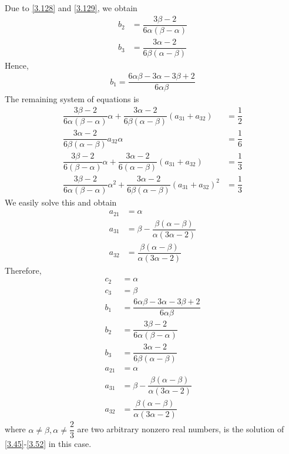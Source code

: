 \documentclass[a4paper,oneside]{book}
\numberwithin{equation}{chapter}
\begin{document}
\begin{enumerate}
Due to \eqref{3.128} and \eqref{3.129}, we obtain
\begin{align}
{b_2} &= \dfrac{{3\beta  - 2}}{{6\alpha \left( {\beta  - \alpha } \right)}}\\
{b_3} &= \dfrac{{3\alpha  - 2}}{{6\beta \left( {\alpha  - \beta } \right)}}
\end{align}
Hence, 
\begin{align}
{b_1} = \dfrac{{6\alpha \beta  - 3\alpha  - 3\beta  + 2}}{{6\alpha \beta }}
\end{align}
The remaining system of equations is
\begin{align}
\dfrac{{3\beta  - 2}}{{6\alpha \left( {\beta  - \alpha } \right)}}\alpha  + \dfrac{{3\alpha  - 2}}{{6\beta \left( {\alpha  - \beta } \right)}}\left( {{a_{31}} + {a_{32}}} \right) &= \dfrac{1}{2}\\
\dfrac{{3\alpha  - 2}}{{6\beta \left( {\alpha  - \beta } \right)}}{a_{32}}\alpha &= \dfrac{1}{6}\\
\dfrac{{3\beta  - 2}}{{6\left( {\beta  - \alpha } \right)}}\alpha  + \dfrac{{3\alpha  - 2}}{{6\left( {\alpha  - \beta } \right)}}\left( {{a_{31}} + {a_{32}}} \right) &= \dfrac{1}{3}\\
\dfrac{{3\beta  - 2}}{{6\alpha \left( {\beta  - \alpha } \right)}}{\alpha ^2} + \dfrac{{3\alpha  - 2}}{{6\beta \left( {\alpha  - \beta } \right)}}{\left( {{a_{31}} + {a_{32}}} \right)^2} &= \dfrac{1}{3}
\end{align}
We easily solve this and obtain
\begin{align}
{a_{21}} &= \alpha \\
{a_{31}} &= \beta  - \dfrac{{\beta \left( {\alpha  - \beta } \right)}}{{\alpha \left( {3\alpha  - 2} \right)}}\\
{a_{32}} &= \dfrac{{\beta \left( {\alpha  - \beta } \right)}}{{\alpha \left( {3\alpha  - 2} \right)}}
\end{align}
Therefore, 
\begin{align}
{c_2} &= \alpha \\
{c_3} &= \beta \\
{b_1} &= \dfrac{{6\alpha \beta  - 3\alpha  - 3\beta  + 2}}{{6\alpha \beta }}\\
{b_2} &= \dfrac{{3\beta  - 2}}{{6\alpha \left( {\beta  - \alpha } \right)}}\\
{b_3} &= \dfrac{{3\alpha  - 2}}{{6\beta \left( {\alpha  - \beta } \right)}}\\
{a_{21}} &= \alpha \\
{a_{31}} &= \beta  - \dfrac{{\beta \left( {\alpha  - \beta } \right)}}{{\alpha \left( {3\alpha  - 2} \right)}}\\
{a_{32}} &= \dfrac{{\beta \left( {\alpha  - \beta } \right)}}{{\alpha \left( {3\alpha  - 2} \right)}}
\end{align}
where $\alpha \ne \beta,\alpha \ne \dfrac{2}{3}$ are two arbitrary nonzero real numbers, is the solution of \eqref{3.45}-\eqref{3.52} in this case.
\end{enumerate}
\end{document}
